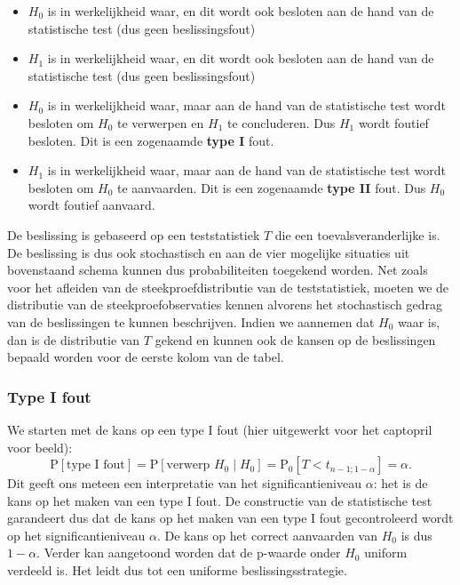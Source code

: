 \documentclass[
  12pt,dutch,coursenotes]{book}
\theoremstyle{definition}
\theoremstyle{definition}
\theoremstyle{definition}
\theoremstyle{remark}
\begin{document}
\begin{itemize}
\item
  \(H_0\) is in werkelijkheid waar, en dit wordt ook besloten aan de hand van de statistische test (dus geen beslissingsfout)
\item
  \(H_1\) is in werkelijkheid waar, en dit wordt ook besloten aan de hand van de statistische test (dus geen beslissingsfout)
\item
  \(H_0\) is in werkelijkheid waar, maar aan de hand van de statistische test wordt besloten om \(H_0\) te verwerpen en \(H_1\) te concluderen. Dus \(H_1\) wordt foutief besloten. Dit is een zogenaamde \textbf{type I} fout.
\item
  \(H_1\) is in werkelijkheid waar, maar aan de hand van de statistische test wordt besloten om \(H_0\) te aanvaarden.
  Dit is een zogenaamde \textbf{type II} fout. Dus \(H_0\) wordt foutief aanvaard.
\end{itemize}

De beslissing is gebaseerd op een teststatistiek \(T\) die een toevalsveranderlijke is. De beslissing is dus ook stochastisch en aan de vier mogelijke situaties uit bovenstaand schema kunnen dus probabiliteiten toegekend worden. Net zoals voor het afleiden van de steekproefdistributie van de teststatistiek, moeten we de distributie van de steekproefobservaties kennen alvorens het stochastisch gedrag van de beslissingen te kunnen beschrijven. Indien we aannemen dat \(H_0\) waar is, dan is de distributie van \(T\) gekend en kunnen ook de kansen op de beslissingen bepaald worden voor de eerste kolom van de tabel.

\hypertarget{type-i-fout}{%
\subsubsection{Type I fout}\label{type-i-fout}}

We starten met de kans op een type I fout (hier uitgewerkt voor het captopril voor beeld):
\[\text{P}\left[\text{type I fout}\right]=\text{P}\left[\text{verwerp }H_0 \mid H_0\right] = \text{P}_0\left[T<t_{n-1;1-\alpha}\right]=\alpha.\]
Dit geeft ons meteen een interpretatie van het significantieniveau \(\alpha\): het is de kans op het maken van een type I fout. De constructie van de statistische test garandeert dus dat de kans op het maken van een type I fout gecontroleerd wordt op het significantieniveau \(\alpha\). De kans op het correct aanvaarden van \(H_0\) is dus \(1-\alpha\).
Verder kan aangetoond worden dat de p-waarde onder \(H_0\) uniform verdeeld is. Het leidt dus tot een uniforme beslissingsstrategie.
\end{document}
